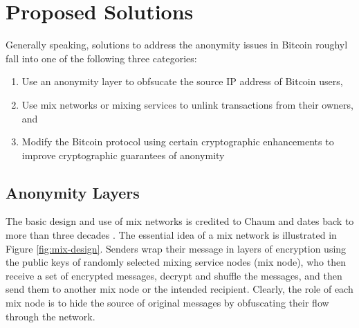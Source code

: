 
\section{Proposed Solutions}
Generally speaking, solutions to address the anonymity issues in Bitcoin roughyl fall into one of the following three categories:
\begin{enumerate}
	\item Use an anonymity layer to obfsucate the source IP address of Bitcoin users,
	\item Use mix networks or mixing services to unlink transactions from their owners, and
	\item Modify the Bitcoin protocol using certain cryptographic enhancements to improve cryptographic guarantees of anonymity
\end{enumerate}

\subsection{Anonymity Layers}


The basic design and use of mix networks is credited to Chaum and dates back to more than three decades \cite{Chaum81-Mix}. The essential idea of a mix network is illustrated in Figure \ref{fig:mix-design}. Senders wrap their message in layers of encryption using the public keys of randomly selected mixing service nodes (mix node), who then receive a set of encrypted messages, decrypt and shuffle the messages, and then send them to another mix node or the intended recipient. Clearly, the role of each mix node is to hide the source of original messages by obfuscating their flow through the network. 

